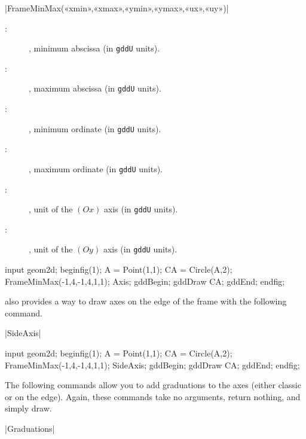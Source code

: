 \documentclass[a4paper,english]{article}
\begin{document}
\begin{colourband}
  \macro|FrameMinMax(«xmin»,«xmax»,«ymin»,«ymax»,«ux»,«uy»)|
  \begin{description}
    \item[:] , minimum abscissa (in \lstinline+gddU+ units).
    \item[:] , maximum abscissa (in \lstinline+gddU+ units).
    \item[:] , minimum ordinate (in \lstinline+gddU+ units).
    \item[:] , maximum ordinate (in \lstinline+gddU+ units).
    \item[:] , unit of the $(Ox)$ axis (in \lstinline+gddU+ units).
    \item[:] , unit of the $(Oy)$ axis (in \lstinline+gddU+ units).
  \end{description}
\end{colourband}

\begin{ExempleMP}
input geom2d;
beginfig(1);
A = Point(1,1);
CA = Circle(A,2);
FrameMinMax(-1,4,-1,4,1,1);
Axis;
gddBegin;
gddDraw CA;
gddEnd;
endfig;
\end{ExempleMP}

\mpgeomdd also provides a way to draw axes on the edge of the frame with the following command.
\begin{colourband}
\macro|SideAxis|
\end{colourband}

\begin{ExempleMP}
input geom2d;
beginfig(1);
A = Point(1,1);
CA = Circle(A,2);
FrameMinMax(-1,4,-1,4,1,1);
SideAxis;
gddBegin;
gddDraw CA;
gddEnd;
endfig;
\end{ExempleMP}


The following commands allow you to add graduations to the axes (either classic or on the edge). Again, these commands take no arguments, return nothing, and simply draw.

\begin{colourband}
\macro|Graduations|
\end{colourband}
\end{document}
